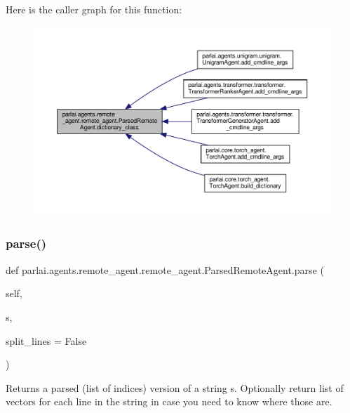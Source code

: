 Here is the caller graph for this function\+:
\nopagebreak
\begin{figure}[H]
\begin{center}
\leavevmode
\includegraphics[width=350pt]{classparlai_1_1agents_1_1remote__agent_1_1remote__agent_1_1ParsedRemoteAgent_a5759817c6b1d248a0b64861222745f62_icgraph}
\end{center}
\end{figure}
\mbox{\label{classparlai_1_1agents_1_1remote__agent_1_1remote__agent_1_1ParsedRemoteAgent_af4dd0281fd7d6ceb4936f27eaab13f06}} 
\subsubsection{\texorpdfstring{parse()}{parse()}}
{\footnotesize\ttfamily def parlai.\+agents.\+remote\+\_\+agent.\+remote\+\_\+agent.\+Parsed\+Remote\+Agent.\+parse (\begin{DoxyParamCaption}\item[{}]{self,  }\item[{}]{s,  }\item[{}]{split\+\_\+lines = {\ttfamily False} }\end{DoxyParamCaption})}

\begin{DoxyVerb}Returns a parsed (list of indices) version of a string s.
Optionally return list of vectors for each line in the string in case
you need to know where those are.
\end{DoxyVerb}
 

